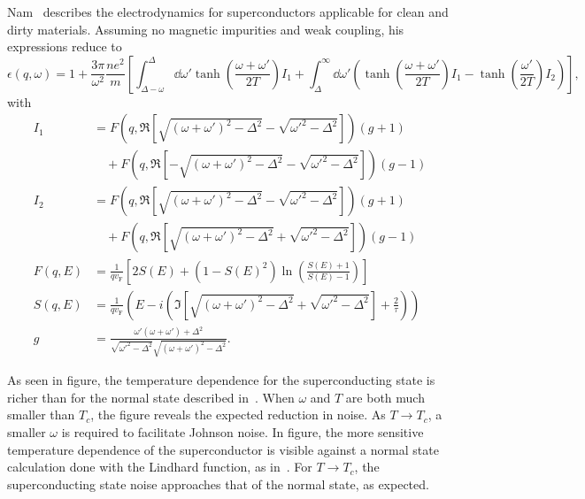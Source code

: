 \documentclass{article}
\newcommand{\vf}{v_{\mathrm{F}}}
\begin{document}
	Nam~\cite{Nam1967} describes the electrodynamics for superconductors applicable for clean and dirty materials.
	Assuming no magnetic impurities and weak coupling, his expressions reduce to
	\begin{equation}
		\epsilon(q, \omega) = 1 + \frac{3 \pi}{\omega^2} \frac{n e^2}{m} \left[\int_{\Delta - \omega}^{\Delta}\dd{\omega'} \tanh(\frac{\omega + \omega'}{2 T}) I_1 + \int_{\Delta}^{\infty} \dd{\omega'} \left( \tanh(\frac{\omega + \omega'}{2 T}) I_1  - \tanh(\frac{\omega'}{2 T})I_2 \right) \right], \label{eq:eps}
	\end{equation}
	with
	\begin{align}
		I_1 &= F(q, \Re[\sqrt{(\omega + \omega')^2 - \Delta^2} - \sqrt{\omega'^2 - \Delta^2}]) (g + 1) \nonumber\\
		&\quad + F(q, \Re[-\sqrt{(\omega + \omega')^2 - \Delta^2} - \sqrt{\omega'^2 - \Delta^2}]) (g - 1) \\
		I_2 &= F(q, \Re[\sqrt{(\omega + \omega')^2 - \Delta^2} - \sqrt{\omega'^2 - \Delta^2}]) (g + 1) \nonumber\\
		&\quad + F(q, \Re[\sqrt{(\omega +  \omega')^2 - \Delta^2} + \sqrt{\omega'^2 - \Delta^2}]) (g - 1) \\
		F(q, E) &= \frac{1}{q \vf} \left[2 S(E) + (1 - S(E)^2)\ln(\frac{S(E) + 1}{S(E) - 1})\right]  \\
		S(q, E) &= \frac{1}{q \vf} \left( E - i \left(\Im[\sqrt{(\omega + \omega')^2 - \Delta^2} + \sqrt{\omega'^2 - \Delta^2}] + \frac{2}{\tau} \right) \right) \\
		g &= \frac{\omega' \left(\omega + \omega'\right) + \Delta^2}{\sqrt{\omega'^2 - \Delta^2}\sqrt{(\omega + \omega')^2 - \Delta^2}}.
	\end{align}

	As seen in figure, the temperature dependence for the superconducting state is richer than for the normal state described in~\cite{QubitRelax}.
	When $\omega$ and $T$ are both much smaller than $T_c$, the figure reveals the expected reduction in noise.
	As $T \rightarrow T_c$, a smaller $\omega$ is required to facilitate Johnson noise.
	In figure, the more sensitive temperature dependence of the superconductor is visible against a normal state calculation done with the Lindhard function, as in~\cite{QubitRelax}.
	For $T \rightarrow T_c$, the superconducting state noise approaches that of the normal state, as expected.
\end{document}
